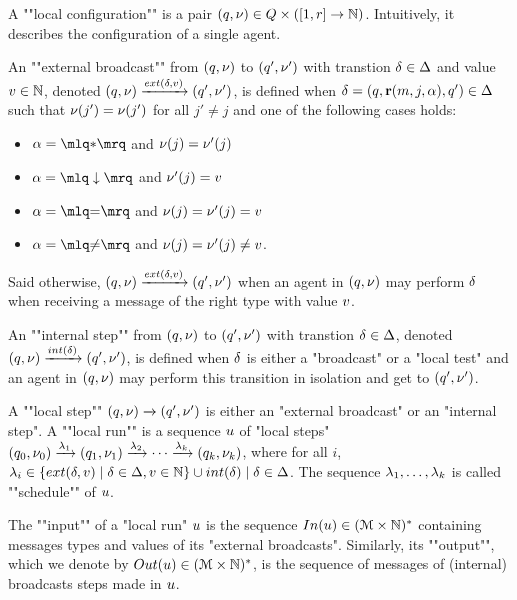 \begin{definition}			
	A ""local configuration"" is a pair $(q, \nu) \in Q \times ([1,r] \to \mathbb{N})$. Intuitively, it describes the configuration of a single agent. 

	An ""external broadcast"" from $(q,\nu)$ to $(q',\nu')$ with transtion $\delta \in \Delta$ and value $v \in \mathbb{N}$, denoted $(q,\localdata) \extbr{\atrans}{\aval} (q',\localdata')$, is defined when $\delta = (q,\textbf{r}(m, j, \alpha),q') \in \Delta$
	such that $\nu(j') = \nu(j')$ for all $j' \neq j$ and one of the following cases holds:
		\begin{itemize}
			\item $\anact = \quotemarks{\dummyact}$ 
			and $\nu(j) = \nu'(j)$
			\item $\anact = \quotemarks{\enregact}$ and $\nu'(j) = v$
			\item $\anact = \quotemarks{\eqtestact}$ and $\nu(j) = \nu'(j)= v$
			\item $\anact = \quotemarks{\diseqtestact}$ and $\nu(j) = \nu'(j) \ne v$.
		\end{itemize}
	Said otherwise, $(q,\localdata) \extbr{\atrans}{\aval} (q',\localdata')$ when an agent in $(q,\nu)$ may perform $\delta$ when receiving a message of the right type with value $v$.

	An ""internal step"" from $(q,\nu)$ to $(q',\nu')$ with transtion $\delta \in \Delta$, denoted $(q,\localdata) \intstep{\atrans} (q',\localdata')$, is defined when $\delta$ is either a "broadcast" or a "local test" and an agent in $(q,\nu)$ may perform this transition in isolation and get to $(q',\nu')$. 

	A ""local step"" $(q,\nu) \xrightarrow{} (q',\nu')$ is either an "external broadcast" or an "internal step". 
	A ""local run"" is a sequence $u$ of "local steps" $(q_0, \nu_0) \xrightarrow{\lambda_1} (q_1, \nu_1) \xrightarrow{\lambda_2} \cdots \xrightarrow{\lambda_k} (q_k, \nu_k)$, where for all $i$, $\locallabel_i \in \set{\extlabel{\atrans}{\aval} \mid \atrans \in \transitions, \aval \in \nats} \cup {\intlabel{\atrans} \mid \atrans \in \transitions}$. The sequence $\lambda_1, \dots, \lambda_k$ is called ""schedule"" of $u$.


	The ""input"" of a "local run" $u$ is the sequence $\Input{\localrun} \in (\messages \times \nats)^*$ containing messages types and values of its "external broadcasts".
	Similarly, its ""output"", which we denote by $\Output{\localrun} \in (\messages \times \nats)^*$, is the sequence of messages of (internal) broadcasts steps made in $u$.
	

\end{definition}
